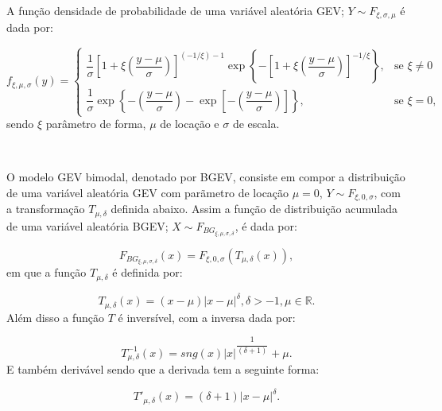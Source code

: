 \documentclass[pdftex,11pt]{article}%
\numberwithin{equation}{section} %
\begin{document}
	
	A função densidade de probabilidade de uma variável aleatória GEV; $Y \sim F_{\xi, \sigma, \mu}$ é dada por: 
	
	\begin{equation}
		f_{\xi, \mu, \sigma}(y)=
			\begin{cases}
			\dfrac{1}{\sigma} \left[ 1+ \xi \left(\dfrac{y-\mu}{\sigma}\right) \right]^{(-1/\xi) -1} \exp\left\{- \left[1+\xi\left(\dfrac{y-\mu}{\sigma}\right)\right]^{-1/\xi}\right\} ,& \text{se } \xi \ne 0 \\
			\dfrac{1}{\sigma} \exp \left\{ - \left(  \dfrac{y-\mu}{\sigma}\right)  - \exp \left[ - \left(  \dfrac{y-\mu}{\sigma}\right)  \right]  \right\},              & \text{se }  \xi = 0 ,
		\end{cases}
		\label{eq:pdf_gev}  
	\end{equation}
sendo $\xi$ parâmetro de forma, $\mu$ de locação e $\sigma$ de escala.

\

O modelo GEV bimodal, denotado por BGEV,  consiste em compor a distribuição de  uma variável aleatória GEV com parãmetro de locação $\mu=0$, $Y \sim F_{\xi, 0,\sigma}$, com a transformação $T_{\mu, \delta}$ definida abaixo. Assim a função de distribuição acumulada de uma variável aleatória BGEV; $X \sim F_{BG_{\xi, \mu, \sigma, \delta}}$, é dada por:

\begin{equation}
	F_{BG_{\xi,\mu,\sigma, \delta}}(x) =  F_{\xi, 0, \sigma}(T_{\mu, \delta}(x)),
	\label{eq:fda_bgev1}
\end{equation}
em que a função $T_{\mu, \delta}$ é definida por:

\begin{equation}
	T_{\mu, \delta}(x)=\left(  x - \mu  \right) \left| x -\mu \right| ^{\delta}, \delta > -1, \mu \in \mathbb{R}.
	\label{eq:T_transformacao}
\end{equation}
Além disso a função $T$ é inversível, com a inversa dada por: 


\begin{equation}
	T^{-1}_{\mu, \delta}(x) = sng(x) |x|^{\dfrac{1}{\left( \delta +1 \right) }} + \mu.
	\label{eq:T_inversa}
\end{equation}
E também derivável sendo que a derivada tem a seguinte forma: 

\begin{equation}
	T'_{\mu, \delta}(x) = (\delta + 1 ) |x - \mu|^{\delta}.
	\label{eq:T_derivada}
\end{equation}
\end{document}
